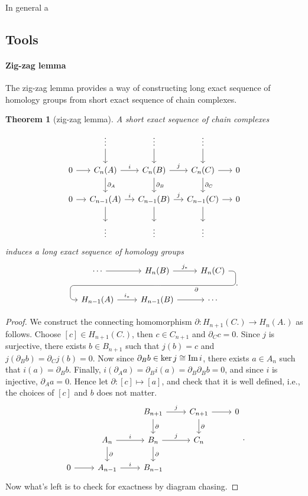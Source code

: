\documentclass[11pt]{article}
\theoremstyle{definition}
\theoremstyle{plain}
\newtheorem{theorem}{Theorem}[section]
\newcommand{\im}{\textup{Im}\,}
\begin{document}
In general a

\newpage
\subsection{Tools}

\paragraph{Zig-zag lemma}

The zig-zag lemma provides a way of constructing long exact sequence of homology groups from short exact sequence of chain complexes.

\begin{theorem}[zig-zag lemma]
A short exact sequence of chain complexes
\[\begin{tikzcd}[column sep=small]
&\vdots\arrow{d}&\vdots\arrow{d}&\vdots\arrow{d}\\
0\arrow{r}&C_n(A)\arrow{d}{\partial_A}\arrow{r}{i}&C_n(B)\arrow{d}{\partial_B}\arrow{r}{j}&C_n(C)\arrow{d}{\partial_C}\arrow{r}&0\\
0\arrow{r}&C_{n-1}(A)\arrow{d}\arrow{r}{i}&C_{n-1}(B)\arrow{d}\arrow{r}{j}&C_{n-1}(C)\arrow{d}\arrow{r}&0\\
&\vdots&\vdots&\vdots
\end{tikzcd}\]
induces a long exact sequence of homology groups
\[\begin{tikzcd}
\cdots \arrow[r]
& H_n(B) \arrow{r}{j_\ast}
\arrow[d, phantom, ""{coordinate, name=Z}]
& H_n(C) \arrow[dll,
"\partial",
rounded corners,
to path={ -- ([xshift=2ex]\tikztostart.east)
|- (Z) [near end]\tikztonodes
-| ([xshift=-2ex]\tikztotarget.west)
-- (\tikztotarget)}] \\
H_{n-1}(A) \arrow{r}{i_\ast}
& H_{n-1}(B) \arrow[r]
& \cdots
\end{tikzcd}.\]
\end{theorem}
\begin{proof}
We construct the connecting homomorphism $\partial:H_{n+1}(C.)\to H_n(A.)$ as follows. Choose $[c]\in H_{n+1}(C.)$, then $c\in C_{n+1}$ and $\partial_C c=0$. Since $j$ is surjective, there exists $b\in B_{n+1}$ such that $j(b)=c$ and $j(\partial_Bb)=\partial_Cj(b)=0$. Now since $\partial_Bb\in\ker j\cong\im i$, there exists $a\in A_n$ such that $i(a)=\partial_Bb$. Finally, $i(\partial_Aa)=\partial_Bi(a)=\partial_B\partial_Bb=0$, and since $i$ is injective, $\partial_Aa=0$. Hence let $\partial:[c]\mapsto[a]$, and check that it is well defined, i.e., the choices of $[c]$ and $b$ does not matter.
\[\begin{tikzcd}
&&B_{n+1}\arrow{d}{\partial}\arrow{r}{j}&C_{n+1}\arrow{d}{\partial}\arrow{r}&0\\
&A_n\arrow{d}{\partial}\arrow{r}{i}&B_n\arrow{d}{\partial}\arrow{r}{j}&C_n\\
0\arrow{r}&A_{n-1}\arrow{r}{i}&B_{n-1}
\end{tikzcd}.\]
Now what's left is to check for exactness by diagram chasing.
\end{proof}
\end{document}
